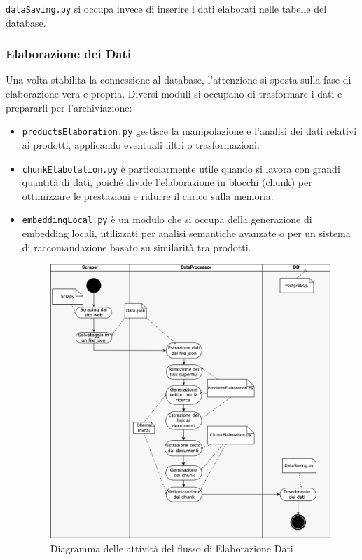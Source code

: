 \texttt{dataSaving.py} si occupa invece di inserire i dati elaborati nelle tabelle del database.

\subsubsection{Elaborazione dei Dati}
Una volta stabilita la connessione al database, l'attenzione si sposta sulla fase di elaborazione vera e propria. Diversi moduli si occupano di trasformare i dati e prepararli per l'archiviazione:

\begin{itemize}
 

\item \texttt{productsElaboration.py} gestisce la manipolazione e l'analisi dei dati relativi ai prodotti, applicando eventuali filtri o trasformazioni.

\item \texttt{chunkElabotation.py} è particolarmente utile quando si lavora con grandi quantità di dati, poiché divide l'elaborazione in blocchi (chunk) per ottimizzare le prestazioni e ridurre il carico sulla memoria.

\item \texttt{embeddingLocal.py} è un modulo che si occupa della generazione di embedding locali,  utilizzati per analisi semantiche avanzate o per un sistema di raccomandazione basato su similarità tra prodotti.

\begin{figure}[H]
    \centering
    \includegraphics[width=\textwidth]{images/flussoSalvataggioDati.png}
    \caption{Diagramma delle attivit\`a del flusso di Elaborazione Dati}
    \label{fig:architettura}
\end{figure}

\end{itemize}
